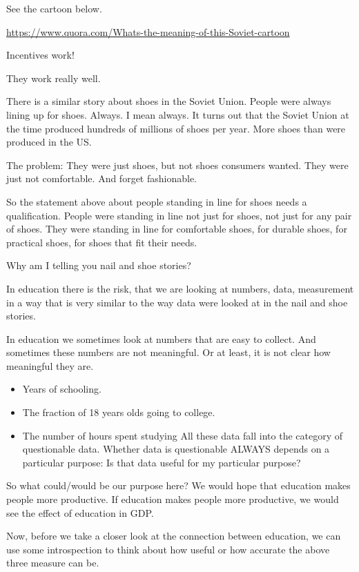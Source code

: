 \documentclass[
]{book}
\providecommand{\tightlist}{%
  \setlength{\itemsep}{0pt}\setlength{\parskip}{0pt}}
\begin{document}
See the cartoon below.

\url{https://www.quora.com/Whats-the-meaning-of-this-Soviet-cartoon}

Incentives work!

They work really well.

There is a similar story about shoes in the Soviet Union. People were always lining up for shoes. Always. I mean always. It turns out that the Soviet Union at the time produced hundreds of millions of shoes per year. More shoes than were produced in the US.

The problem: They were just shoes, but not shoes consumers wanted. They were just not comfortable. And forget fashionable.

So the statement above about people standing in line for shoes needs a qualification. People were standing in line not just for shoes, not just for any pair of shoes. They were standing in line for comfortable shoes, for durable shoes, for practical shoes, for shoes that fit their needs.

Why am I telling you nail and shoe stories?

In education there is the risk, that we are looking at numbers, data, measurement in a way that is very similar to the way data were looked at in the nail and shoe stories.

In education we sometimes look at numbers that are easy to collect. And sometimes these numbers are not meaningful. Or at least, it is not clear how meaningful they are.

\begin{itemize}
\tightlist
\item
  Years of schooling.
\item
  The fraction of 18 years olds going to college.
\item
  The number of hours spent studying
  All these data fall into the category of questionable data. Whether data is questionable ALWAYS depends on a particular purpose: Is that data useful for my particular purpose?
\end{itemize}

So what could/would be our purpose here? We would hope that education makes people more productive. If education makes people more productive, we would see the effect of education in GDP.

Now, before we take a closer look at the connection between education, we can use some introspection to think about how useful or how accurate the above three measure can be.
\end{document}
